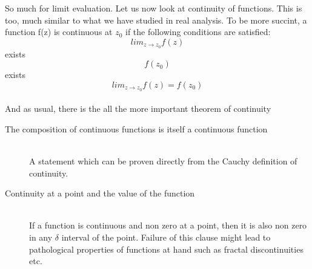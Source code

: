 \documentclass[11pt]{article}
\begin{document}
\begin{sloppypar}
So much for limit evaluation. Let us now look at continuity of functions. This is too, much similar to what we have studied in real analysis. To be more succint, a function f(z) is continuous at $z_{0}$ if the following conditions are satisfied:\\
$$lim_{z \to z_{0}}f(z)$$ exists\\
$$f(z_{0})$$ exists \\
$$lim_{z \to z_{0}}f(z) = f(z_{0})$$ \\
And as usual, there is the all the more important theorem of continuity
\begin{description}
\item[The composition of continuous functions is itself a continuous function]  \hfill \\
	A statement which can be proven directly from the Cauchy definition of continuity. 
\item[Continuity at a point and the value of the function] \hfill \\
	If a function is continuous and non zero at a point, then it is also non zero in any $\delta$ interval of the point. Failure of this clause might lead to pathological properties of functions at hand such as fractal discontinuities etc.
\end{description}


\end{sloppypar}
\end{document}

